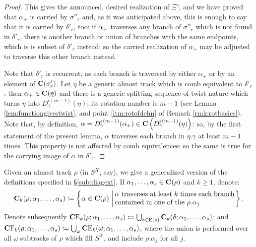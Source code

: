 \begin{proof}
This gives the announced, desired realization of $\Xi'$; and we have proved that $\alpha_+$ is carried by $\sigma''_r$ and, as it was anticipated above, this is enough to say that it is carried by $\delta'_r$, too: if $\underline{\alpha}_+$ traverses any branch of $\sigma''_r$ which is not found in $\delta'_r$, there is another branch or union of branches with the same endpoints, which is is subset of $\delta'_r$ instead: so the carried realization of $\alpha_+$ may be adjusted to traverse this other branch instead.

Note that $\delta'_r$ is recurrent, as each branch is traversed by either $\alpha_+$ or by an element of $\mathbf C(\sigma'_r)$. Let $\eta$ be a generic almost track which is comb equivalent to $\delta'_r$: then $\alpha_+\in\mathbf C(\eta)$ and there is a generic splitting sequence of twist nature which turns $\eta$ into $D_\gamma^{\epsilon(m-1)}(\eta)$; its rotation number is $m-1$ (see Lemma \ref{lem:functiongivestwist}, and point \ref{itm:rotofdehn} of Remark \ref{rmk:rotbasics}). Note that, by definition, $\alpha=D_\gamma^{\varepsilon(m-1)}(\alpha_+)\in\mathbf C\left(D_\gamma^{\varepsilon(m-1)}(\eta)\right)$: so, by the first statement of the present lemma, $\alpha$ traverses each branch in $\eta.\gamma$ at least $m-1$ times. This property is not affected by comb equivalences: so the same is true for the carrying image of $\alpha$ in $\delta'_r$.
\end{proof}

Given an almost track $\rho$ (in $S^X$, say), we give a generalized version of the definitions specified in \S \ref{sub:diagext}. If $\alpha_1,\ldots,\alpha_s\in\mathbf C(\rho)$ and $k\geq 1$, denote:
$$
\cc_k(\rho;\alpha_1,\ldots,\alpha_s)\coloneqq\left\{\alpha\in \cc(\rho)\,\left|\,\parbox{.5\textwidth}{$\alpha$ traverses at least $k$ times each branch contained in one of the $\rho.\alpha_j$}\right.\right\}.
$$
Denote subsequently $\mathbf C \mathrm E_k(\rho;\alpha_1,\ldots,\alpha_s) \coloneqq \bigcup_{\delta\in \mathrm{E}(\rho)}  \mathbf C_k(\delta;\alpha_1,\ldots,\alpha_s)$; and\linebreak $\mathbf C \mathrm F_k(\rho;\alpha_1,\ldots,\alpha_s)\coloneqq \bigcup_\omega \mathbf C \mathrm E_k(\omega;\alpha_1,\ldots,\alpha_s)$, where the union is performed over all $\omega$ subtracks of $\rho$ which fill $S^X$, and include $\rho.\alpha_j$ for all $j$.

